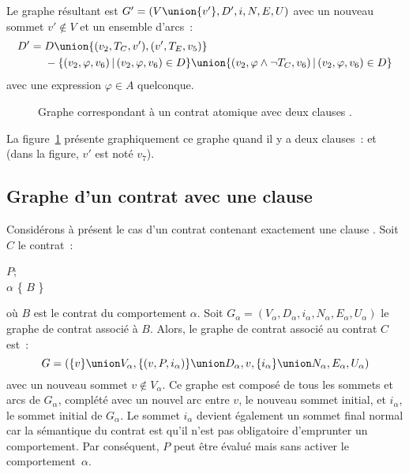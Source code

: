 Le graphe résultant est $G' = (V \union \{v'\}, D', i, N, E, U)$ avec un nouveau
sommet $v' \notin V$ et un ensemble d'arcs~:
%
\begin{align*}
%
D' =\;
  & D \union \{(v_2, T_C, v'), (v', T_E, v_5)\} \\
  & - \{(v_2, \varphi, v_6) \,\vert\, (v_2, \varphi, v_6) \in D\} \union
      \{(v_2, \varphi \land \neg T_C, v_6) \,\vert\, (v_2, \varphi, v_6) \in D\}
%
\end{align*}
%
avec une expression $\varphi \in A$ quelconque.

\begin{figure}


\caption{\label{figure:test:throwable_graph} Graphe correspondant à un contrat
atomique avec deux clauses \athrowable.}

\end{figure}

\begin{example}

La figure~\ref{figure:test:throwable_graph} présente graphiquement ce graphe
quand il y a deux clauses~:  et
 (dans la figure, $v'$ est noté
$v_7$).

\end{example}

\subsection{Graphe d'un contrat avec une clause \abehavior}
\label{subsection:test:behavior_graph}

Considérons à présent le cas d'un contrat contenant exactement une clause
\abehavior. Soit $C$ le contrat~:
%
\begin{pre}
\arequires \(P\); \\
\abehavior \(\alpha\) \{ \(B\) \}
\end{pre}
%
où $B$ est le contrat du comportement $\alpha$. Soit $G_\alpha = (V_\alpha,
D_\alpha, i_\alpha, N_\alpha, E_\alpha, U_\alpha)$ le graphe de contrat associé
à $B$. Alors, le graphe de contrat associé au contrat $C$ est~:
%
$$G = (
  \{v\} \union V_\alpha,
  \{(v, P, i_\alpha)\} \union D_\alpha,
  v,
  \{i_\alpha\} \union N_\alpha,
  E_\alpha,
  U_\alpha
)$$
%
avec un nouveau sommet $v \notin V_\alpha$. Ce graphe est composé de tous les
sommets et arcs de $G_\alpha$, complété avec un nouvel arc entre $v$, le nouveau
sommet initial, et $i_\alpha$, le sommet initial de $G_\alpha$. Le sommet
$i_\alpha$ devient également un sommet final normal car la sémantique du contrat
est qu'il n'est pas obligatoire d'emprunter un comportement. Par conséquent, $P$
peut être évalué mais sans activer le comportement~$\alpha$.

